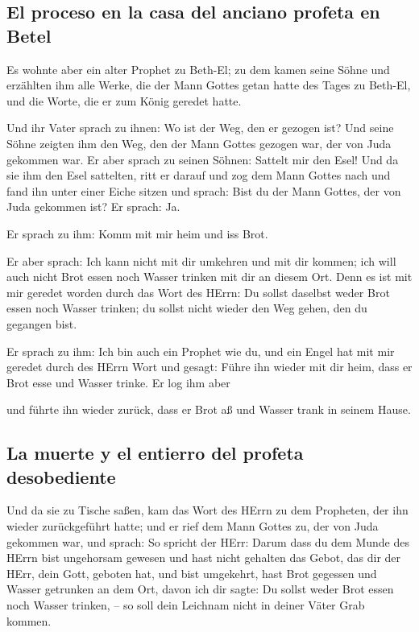 \hypertarget{el-proceso-en-la-casa-del-anciano-profeta-en-betel}{%
\subsection{El proceso en la casa del anciano profeta en
Betel}\label{el-proceso-en-la-casa-del-anciano-profeta-en-betel}}

 Es wohnte aber ein alter Prophet zu Beth-El; zu dem
kamen seine Söhne und erzählten ihm alle Werke, die der Mann Gottes
getan hatte des Tages zu Beth-El, und die Worte, die er zum König
geredet hatte.

 Und ihr Vater sprach zu ihnen: Wo ist der Weg, den er
gezogen ist? Und seine Söhne zeigten ihm den Weg, den der Mann Gottes
gezogen war, der von Juda gekommen war.  Er aber sprach
zu seinen Söhnen: Sattelt mir den Esel! Und da sie ihm den Esel
sattelten, ritt er darauf  und zog dem Mann Gottes nach
und fand ihn unter einer Eiche sitzen und sprach: Bist du der Mann
Gottes, der von Juda gekommen ist? Er sprach: Ja.

 Er sprach zu ihm: Komm mit mir heim und iss Brot.

 Er aber sprach: Ich kann nicht mit dir umkehren und mit
dir kommen; ich will auch nicht Brot essen noch Wasser trinken mit dir
an diesem Ort.  Denn es ist mit mir geredet worden durch
das Wort des HErrn: Du sollst daselbst weder Brot essen noch Wasser
trinken; du sollst nicht wieder den Weg gehen, den du gegangen bist.

 Er sprach zu ihm: Ich bin auch ein Prophet wie du, und
ein Engel hat mit mir geredet durch des HErrn Wort und gesagt: Führe ihn
wieder mit dir heim, dass er Brot esse und Wasser trinke. Er log ihm
aber

 und führte ihn wieder zurück, dass er Brot aß und Wasser
trank in seinem Hause.

\hypertarget{la-muerte-y-el-entierro-del-profeta-desobediente}{%
\subsection{La muerte y el entierro del profeta
desobediente}\label{la-muerte-y-el-entierro-del-profeta-desobediente}}

 Und da sie zu Tische saßen, kam das Wort des HErrn zu
dem Propheten, der ihn wieder zurückgeführt hatte;  und
er rief dem Mann Gottes zu, der von Juda gekommen war, und sprach: So
spricht der HErr: Darum dass du dem Munde des HErrn bist ungehorsam
gewesen und hast nicht gehalten das Gebot, das dir der HErr, dein Gott,
geboten hat,  und bist umgekehrt, hast Brot gegessen und
Wasser getrunken an dem Ort, davon ich dir sagte: Du sollst weder Brot
essen noch Wasser trinken, -- so soll dein Leichnam nicht in deiner
Väter Grab kommen.

